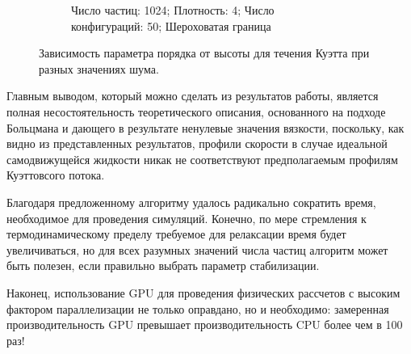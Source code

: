 \begin{figure}
\begin{subfigure}{\textwidth}
            \caption{Число частиц: 1024; Плотность: 4; Число конфигураций: 50; Шероховатая граница}
            \label{fig:Results:4kNew}
        \end{subfigure}
    \caption{Зависимость параметра порядка от высоты для течения Куэтта при разных значениях шума.}
    \label{fig:Results}
\end{figure}

\label{ch:Conclusion}
Главным выводом, который можно сделать из результатов работы, является полная несостоятельность теоретического описания, основанного на подходе Больцмана и дающего в результате ненулевые значения вязкости, поскольку, как видно из представленных результатов, профили скорости в случае идеальной самодвижущейся жидкости никак не соответствуют предполагаемым профилям Куэттовсого потока.

Благодаря предложенному алгоритму удалось радикально сократить время, необходимое для проведения симуляций. Конечно, по мере стремления к термодинамическому пределу требуемое для релаксации время будет увеличиваться, но для всех разумных значений числа частиц алгоритм может быть полезен, если правильно выбрать параметр стабилизации.

Наконец, использование GPU для проведения физических рассчетов с высоким фактором параллелизации не только оправдано, но и необходимо: замеренная производительность GPU превышает производительность CPU более чем в 100 раз!